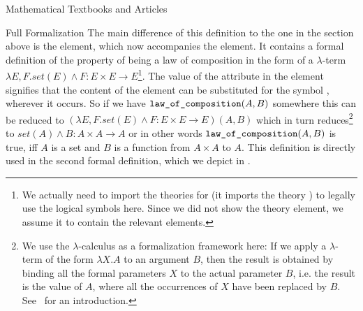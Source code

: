 \begin{tchapter}[id=algebra,short=Textbooks and Articles]{Mathematical Textbooks and Articles}
\begin{tsection}[id=formalization]{Full Formalization}
\noindent The main difference of this definition to the one in the
section above is the {} element, which now
accompanies the {} element. It contains a formal
definition of the property of being a law of composition in the form
of a $\lambda$-term $\lambda{E,F}.set(E)\wedge F:E\times E\to
E$\footnote{We actually need to
  import the theories {} for {} (it imports
  the theory {}) to legally use the logical symbols here. Since we did not
  show the theory element, we assume it to contain the relevant {}
  elements.}. The value {} of the
{} attribute in the {} element signifies
that the content of the {} element can be substituted for the symbol
{}, wherever it occurs. So if we have
${\texttt{law\_of\_composition}}(A,B)$ somewhere this can be reduced to
$(\lambda{E,F}.set(E)\wedge F:E\times E\to E)(A,B)$ which in turn reduces\footnote{We use
  the $\lambda$-calculus as a formalization framework here: If we
  apply a $\lambda$-term of the form $\lambda{X}.A$ to an argument $B$, then the result is
  obtained by binding all the formal parameters $X$ to the actual parameter $B$, i.e. the
  result is the value of $A$, where all the occurrences of $X$ have been replaced by $B$.
  See~\cite{Barendregt80,Andrews02} for an introduction.} to $set(A)\wedge B:A\times A\to
A$ or in other words ${\texttt{law\_of\_composition}}(A,B)$ is true, iff $A$ is a set and
$B$ is a function from $A\times A$ to $A$. This definition is directly used in the second
formal definition, which we depict in {}.


\end{tsection}
\end{tchapter}

